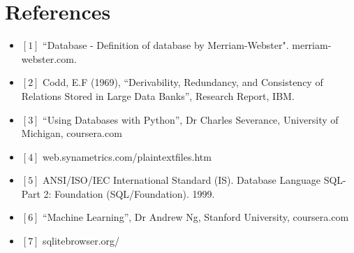 \documentclass[11pt, a4paper]{article}
\begin{document}
\section{References}
\begin{itemize}
\item $[1]$ \quad ``Database - Definition of database by Merriam-Webster". merriam-webster.com.
\item $[2]$ \quad Codd, E.F (1969), ``Derivability, Redundancy, and Consistency of Relations Stored in Large Data Banks'', Research Report, IBM.
\item $[3]$ \quad ``Using Databases with Python'', Dr Charles Severance, University of Michigan, coursera.com
\item $[4]$ \quad web.synametrics.com/plaintextfiles.htm
\item $[5]$ \quad ANSI/ISO/IEC International Standard (IS). Database Language SQL-Part 2: Foundation (SQL/Foundation). 1999.
\item $[6]$ \quad ``Machine Learning'', Dr Andrew Ng, Stanford University, coursera.com
\item $[7]$ \quad sqlitebrowser.org/
\end{itemize}
\end{document}
